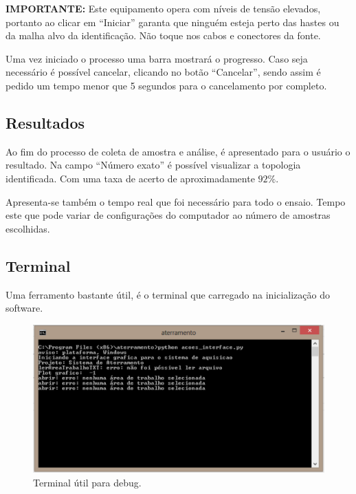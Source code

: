 \documentclass[a4paper, 10pt]{article}
\begin{document}
\textbf{IMPORTANTE:} Este equipamento opera com níveis de tensão elevados, portanto ao clicar em 
``Iniciar'' garanta que ninguém esteja perto das hastes ou da malha alvo da identificação. Não toque
nos cabos e conectores da fonte.

Uma vez iniciado o processo uma barra mostrará o progresso. Caso seja necessário é possível cancelar, 
clicando no botão ``Cancelar'', sendo assim é pedido um tempo menor que 5 segundos para o cancelamento
por completo.

\subsection{Resultados}


Ao fim do processo de coleta de amostra e análise, é apresentado para o usuário o resultado. 
Na campo ``Número exato'' é possível visualizar a topologia identificada. Com uma taxa de 
acerto de aproximadamente $92 \%$.

Apresenta-se também o tempo real que foi necessário para todo o ensaio. Tempo este que pode variar
de configurações do computador  ao número de amostras escolhidas.

\subsection{Terminal}

Uma ferramento bastante útil, é o terminal que carregado na inicialização do software.

\begin{figure}[!h]
    \caption{\label{fig_terminal}Terminal útil para debug.}
	    \begin{center}
            \includegraphics[scale=0.3]{../fotos/execucao/terminal.pdf}
	    \end{center}
\end{figure}
\end{document}
